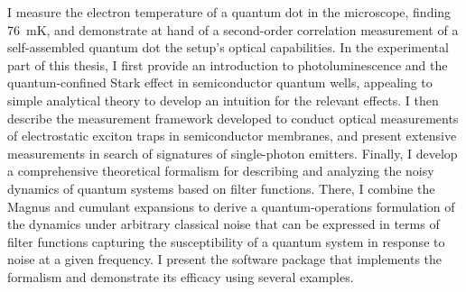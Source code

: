{    I measure the electron temperature of a  quantum dot in the microscope, finding \qty{76}{\milli\kelvin}, and demonstrate at hand of a second-order correlation measurement of a self-assembled quantum dot the setup's optical capabilities.
    In the experimental part of this thesis, I first provide an introduction to photoluminescence and the quantum-confined Stark effect in semiconductor quantum wells, appealing to simple analytical theory to develop an intuition for the relevant effects.
    I then describe the \mjolnir measurement framework developed to conduct optical measurements of electrostatic exciton traps in semiconductor membranes, and present extensive measurements in search of signatures of single-photon emitters.
    Finally, I develop a comprehensive theoretical formalism for describing and analyzing the noisy dynamics of quantum systems based on filter functions.
    There, I combine the Magnus and cumulant expansions to derive a quantum-operations formulation of the dynamics under arbitrary classical noise that can be expressed in terms of filter functions capturing the susceptibility of a quantum system in response to noise at a given frequency.
    I present the \filterfunctions software package that implements the formalism and demonstrate its efficacy using several examples.
}
